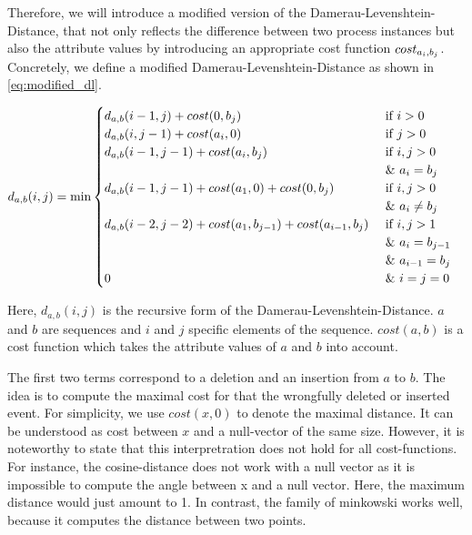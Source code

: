 \documentclass[./../../paper.tex]{subfiles}
\begin{document}

\noindent Therefore, we will introduce a modified version of the Damerau-Levenshtein-Distance, that not only reflects the difference between two process instances but also the attribute values by introducing an appropriate cost function $cost_{a_i, b_j}$. Concretely, we define a modified Damerau-Levenshtein-Distance as shown in \autoref{eq:modified_dl}.

\begin{align}
    \label{eq:modified_dl}
    d_{a, b}(i, j) & =\min
    \begin{cases}
        d_{a, b}(i-1, j  )+cost(0, b_j) & \text { if } i>0                                            \\
        d_{a, b}(i  , j-1)+cost(a_i, 0) & \text { if } j>0                                            \\
        d_{a, b}(i-1, j-1)+cost(a_i, b_j) & \text { if } i, j>0   \\ & \text { \& } a_{i}=b_{j}                                       \\
        d_{a, b}(i-1, j-1)+cost(a_1, 0) + cost(0, b_j) & \text { if } i, j>0  \\ & \text { \& } a_{i} \neq b_{j}                                       \\
        d_{a, b}(i-2, j-2)+cost(a_1, b_{j-1}) + cost(a_{i-1}, b_j) & \text { if } i, j>1 \\ 
        & \text { \& } a_{i}=b_{j-1} \\ 
        & \text { \& } a_{i-1}=b_{j} \\
        0                                 & \text { \& } i=j=0                                          
    \end{cases} 
\end{align}

\noindent Here, $d_{a, b}(i, j)$ is the recursive form of the Damerau-Levenshtein-Distance. $a$ and $b$ are sequences and $i$ and $j$ specific elements of the sequence. $cost(a,b)$ is a cost function which takes the attribute values of $a$ and $b$ into account. 

The first two terms correspond to a deletion and an insertion from $a$ to $b$. The idea is to compute the maximal cost for that the wrongfully deleted or inserted event. For simplicity, we use $cost(x,0)$ to denote the maximal distance. It can be understood as cost between $x$ and a null-vector of the same size. However, it is noteworthy to state that this interpretration does not hold for all cost-functions. For instance, the cosine-distance does not work with a null vector as it is impossible to compute the angle between x and a null vector. Here, the maximum distance would just amount to 1. In contrast, the family of \Gls{minkowski} works well, because it computes the distance between two points. 
\end{document}
